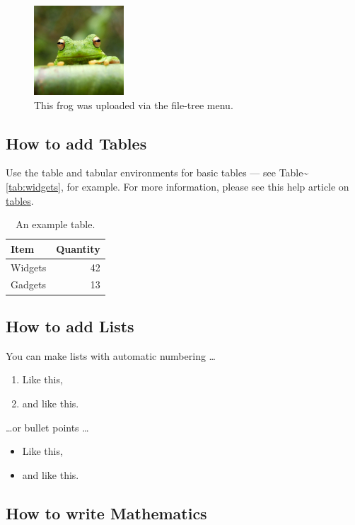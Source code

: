 \documentclass[
  12pt,
  letterpaper,
  DIV=11,
  numbers=noendperiod]{scrartcl}
\begin{document}
\begin{figure}
\centering
\includegraphics[width=0.3\textwidth]{supp/frog.jpg}
\caption{\label{fig:frog}This frog was uploaded via the file-tree menu.}
\end{figure}

\subsection{How to add Tables}

Use the table and tabular environments for basic tables --- see
Table\textasciitilde{}\ref{tab:widgets}, for example. For more
information, please see this help article on
\href{https://www.overleaf.com/learn/latex/tables}{tables}.

\begin{table}
\centering
\begin{tabular}{l|r}
Item & Quantity \\\hline
Widgets & 42 \\
Gadgets & 13
\end{tabular}
\caption{An example table.}
\end{table}

\subsection{How to add Lists}

You can make lists with automatic numbering \dots

\begin{enumerate}
  \item Like this,
  \item and like this.
\end{enumerate}

\dots or bullet points \dots

\begin{itemize}
  \item Like this,
  \item and like this.
\end{itemize}

\subsection{How to write Mathematics}
\end{document}
